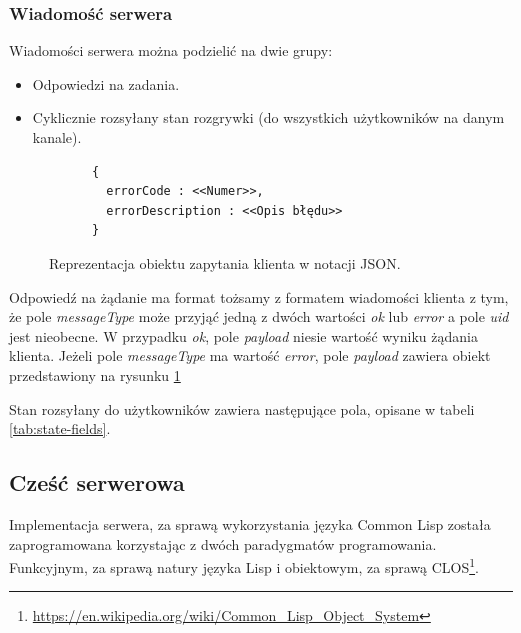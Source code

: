 \subsubsection{Wiadomość serwera}
Wiadomości serwera można podzielić na dwie grupy:
\begin{itemize}
  \item Odpowiedzi na zadania.
  \item Cyklicznie rozsyłany stan rozgrywki (do wszystkich użytkowników na danym kanale).
\end{itemize}

\begin{figure}[ht]
    \centering
    \begin{verbatim}
      {
        errorCode : <<Numer>>,
        errorDescription : <<Opis błędu>>
      }
      \end{verbatim}
    \caption{Reprezentacja obiektu zapytania klienta w notacji JSON.}
    \label{fig:errors}
\end{figure}


Odpowiedź na żądanie ma format tożsamy z formatem wiadomości klienta z tym, że pole \emph{messageType} może przyjąć jedną z dwóch wartości \emph{ok} lub \emph{error} a pole \emph{uid} jest nieobecne. W przypadku \emph{ok}, pole \emph{payload} niesie wartość wyniku żądania klienta. Jeżeli pole \emph{messageType} ma wartość \emph{error}, pole \emph{payload} zawiera obiekt przedstawiony na rysunku \ref{fig:errors}

Stan rozsyłany do użytkowników zawiera następujące pola, opisane w tabeli \ref{tab:state-fields}.


\subsection{Cześć serwerowa}
Implementacja serwera, za sprawą wykorzystania języka Common Lisp została zaprogramowana korzystając z dwóch paradygmatów programowania. Funkcyjnym, za sprawą natury języka Lisp i obiektowym, za sprawą CLOS\footnote{\url{https://en.wikipedia.org/wiki/Common_Lisp_Object_System}}.


